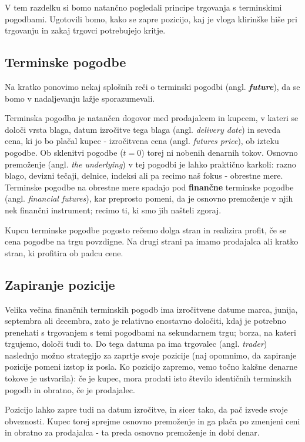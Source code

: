 \documentclass[a4paper, 11pt]{article}
\begin{document}
V tem razdelku si bomo natančno pogledali principe trgovanja s terminskimi pogodbami. Ugotovili
bomo, kako se zapre pozicijo, kaj je vloga klirinške hiše pri trgovanju in zakaj trgovci potrebujejo
kritje.

\subsection{Terminske pogodbe}
Na kratko ponovimo nekaj splošnih reči o terminski pogodbi (angl. \textit{\textbf{future}}), da se 
bomo v nadaljevanju lažje sporazumevali.

Terminska pogodba je natančen dogovor med prodajalcem in kupcem, v kateri se določi vrsta
blaga, datum izročitve tega blaga (angl. \textit{delivery date}) in seveda cena, 
ki jo bo plačal kupec - izročitvena cena (angl. \textit{futures price}), ob izteku pogodbe. 
Ob sklenitvi pogodbe ($t = 0$) torej ni nobenih denarnih tokov.
Osnovno premoženje (angl. \textit{the underlying}) v tej pogodbi je lahko praktično karkoli: 
razno blago, devizni tečaji, delnice, indeksi ali pa recimo naš fokus - obrestne mere. 
Terminske pogodbe na obrestne mere spadajo pod \textbf{finančne} terminske pogodbe 
(angl. \textit{financial futures}), kar preprosto pomeni, da je osnovno premoženje v njih nek
finančni instrument; recimo ti, ki smo jih našteli zgoraj.

Kupcu terminske pogodbe pogosto rečemo dolga stran in realizira profit, če se cena pogodbe na 
trgu povzdigne. Na drugi strani pa imamo prodajalca ali kratko stran, ki profitira ob padcu cene.

\subsection{Zapiranje pozicije}
Velika večina finančnih terminskih pogodb ima izročitvene datume marca, junija, septembra ali 
decembra, zato je relativno enostavno določiti, kdaj je potrebno prenehati s trgovanjem s temi 
pogodbami na sekundarnem trgu; borza, na kateri trgujemo, določi tudi to. Do tega datuma pa 
ima trgovalec (angl. \textit{trader}) naslednjo možno strategijo za zaprtje svoje pozicije 
(naj opomnimo, da zapiranje pozicije pomeni izstop iz posla. Ko pozicijo zapremo, vemo točno 
kakšne denarne tokove je ustvarila): če je kupec, mora prodati isto število identičnih 
terminskih pogodb in obratno, če je prodajalec.

Pozicijo lahko zapre tudi na datum izročitve, in sicer tako, da pač izvede svoje obveznosti. 
Kupec torej sprejme osnovno premoženje in ga plača po zmenjeni ceni in obratno za prodajalca - 
ta preda osnovno premoženje in dobi denar. 
\end{document}
